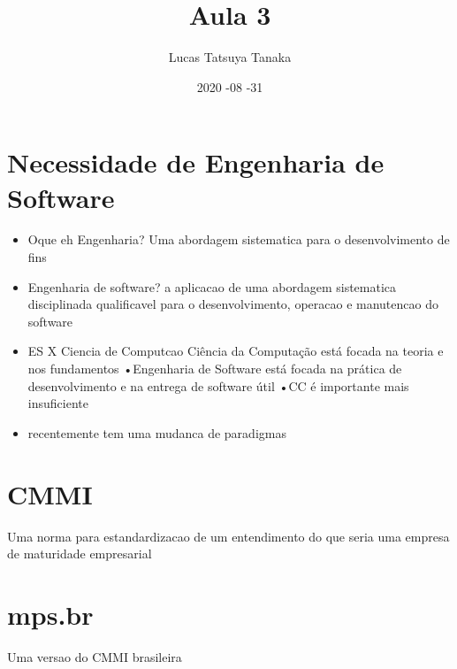 \documentclass{article} %
\title{Aula 3} %
\date{2020 -08 -31{}}
\author{Lucas Tatsuya Tanaka}
\begin{document}
  \maketitle

  \section{Necessidade de Engenharia de Software}
    \begin{itemize}
        \item Oque eh Engenharia? Uma abordagem sistematica para o desenvolvimento de fins 
        \item Engenharia de software? a aplicacao de uma abordagem sistematica 
            disciplinada qualificavel para o desenvolvimento, operacao e manutencao do software
        \item ES X Ciencia de Computcao 
            Ciência da Computação está focada na teoria e nos
            fundamentos
            •Engenharia de Software está focada na prática de
            desenvolvimento e na entrega de software útil
            •CC é importante mais insuficiente
        \item recentemente tem uma mudanca de paradigmas 


    \end{itemize}
    \section{CMMI}
    Uma norma para estandardizacao de um entendimento do que seria uma empresa de maturidade empresarial 
    \section{mps.br}
    Uma versao do CMMI brasileira
\end{document}
